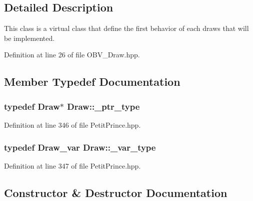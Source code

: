 \subsection{Detailed Description}
This class is a virtual class that define the first behavior of each draws that will be implemented. 

Definition at line 26 of file O\+B\+V\+\_\+\+Draw.\+hpp.



\subsection{Member Typedef Documentation}
\subsubsection[{\texorpdfstring{\+\_\+ptr\+\_\+type}{_ptr_type}}]{\setlength{\rightskip}{0pt plus 5cm}typedef {\bf Draw}$\ast$ {\bf Draw\+::\+\_\+ptr\+\_\+type}}\hypertarget{class_draw_a5164256572b3c4123ceecd1897c248dd}{}\label{class_draw_a5164256572b3c4123ceecd1897c248dd}


Definition at line 346 of file Petit\+Prince.\+hpp.

\subsubsection[{\texorpdfstring{\+\_\+var\+\_\+type}{_var_type}}]{\setlength{\rightskip}{0pt plus 5cm}typedef {\bf Draw\+\_\+var} {\bf Draw\+::\+\_\+var\+\_\+type}}\hypertarget{class_draw_a0ef4fbc763491a2013fa08badb5ee934}{}\label{class_draw_a0ef4fbc763491a2013fa08badb5ee934}


Definition at line 347 of file Petit\+Prince.\+hpp.



\subsection{Constructor \& Destructor Documentation}
